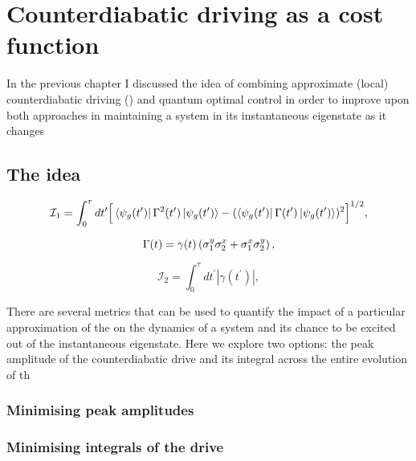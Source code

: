 \chapter{Counterdiabatic driving as a cost function}\label{chap:5_cd_as_costfunc}

In the previous chapter I discussed the idea of combining approximate (local) counterdiabatic driving () and quantum optimal control in order to improve upon both approaches in maintaining a system in its instantaneous eigenstate as it changes  

\section{The idea}

\begin{equation}\label{eq:AGP_integral_1}
\mathcal{I}_1 = \int_0^\tau dt^\prime \Big[\bra{\psi_g(t^\prime)} \Gamma^2(t^\prime) \ket{\psi_g(t^\prime)}  - (\bra{\psi_g(t^\prime)} \Gamma(t^\prime) \ket{\psi_g(t^\prime)})^2\Big]^{1/2},
\end{equation}

\begin{equation}\label{eq:Gamma_def}
\Gamma(t) = \gamma(t) \left( \sigma^y_1 \sigma^x_2 + \sigma^x_1 \sigma^y_2 \right),
\end{equation}

\begin{equation}\label{eq:AGP_integral_2}
\mathcal{I}_2 = \int_0^\tau dt^\prime |\gamma(t^\prime)|,
\end{equation}

There are several metrics that can be used to quantify the impact of a particular approximation of the  on the dynamics of a system and its chance to be excited out of the instantaneous eigenstate. Here we explore two options: the peak amplitude of the counterdiabatic drive and its integral across the entire evolution of th

\subsection{Minimising peak amplitudes}

\subsection{Minimising integrals of the drive}

